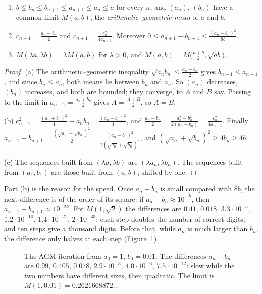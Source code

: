 \begin{proposition}\label{prop:agm}
\begin{enumerate}[label=(\alph*)]
\item $b\le b_n\le b_{n+1}\le a_{n+1}\le a_n\le a$ for every $n$, and $(a_n)$, $(b_n)$ have a common limit $M(a,b)$, the \emph{arithmetic--geometric mean} of $a$ and $b$.
\item $c_{n+1}=\frac{a_n-b_n}2$ and $c_{n+1}=\frac{c_n^2}{4a_{n+1}}$. Moreover $0\le a_{n+1}-b_{n+1}\le\frac{(a_n-b_n)^2}{8b}$.
\item $M(\lambda a,\lambda b)=\lambda M(a,b)$ for $\lambda>0$, and $M(a,b)=M\bigl(\frac{a+b}2,\sqrt{ab}\bigr)$.
\end{enumerate}
\end{proposition}
\begin{proof}
(a) The arithmetic--geometric inequality $\sqrt{a_nb_n}\le\frac{a_n+b_n}2$ gives $b_{n+1}\le a_{n+1}$, and since $b_n\le a_n$, both means lie between $b_n$ and $a_n$.
So $(a_n)$ decreases, $(b_n)$ increases, and both are bounded; they converge, to $A$ and $B$ say. Passing to the limit in $a_{n+1}=\frac{a_n+b_n}2$ gives $A=\frac{A+B}2$, so $A=B$.

(b) $c_{n+1}^2=\frac{(a_n+b_n)^2}4-a_nb_n=\frac{(a_n-b_n)^2}4$, and $\frac{a_n-b_n}2=\frac{a_n^2-b_n^2}{2(a_n+b_n)}=\frac{c_n^2}{4a_{n+1}}$. Finally
$a_{n+1}-b_{n+1}=\frac{(\sqrt{a_n}-\sqrt{b_n})^2}2=\frac{(a_n-b_n)^2}{2(\sqrt{a_n}+\sqrt{b_n})^2}$, and $(\sqrt{a_n}+\sqrt{b_n})^2\ge4b_n\ge4b$.

(c) The sequences built from $(\lambda a,\lambda b)$ are $(\lambda a_n,\lambda b_n)$. The sequences built from $(a_1,b_1)$ are those built from $(a,b)$, shifted by one.
\end{proof}

Part (b) is the reason for the speed. Once $a_n-b_n$ is small compared with $8b$, the next difference is of the order of its square: if $a_n-b_n\approx10^{-k}$,
then $a_{n+1}-b_{n+1}\approx10^{-2k}$. For $M(1,\sqrt2)$ the differences are $0.41$, $0.018$, $3.3\cdot10^{-5}$, $1.2\cdot10^{-10}$, $1.4\cdot10^{-21}$, $2\cdot10^{-43}$:
each step doubles the number of correct digits, and ten steps give a thousand digits. Before that, while $a_n$ is much larger than $b_n$, the
difference only halves at each step (Figure~\ref{fig:agm}).

\begin{figure}[ht]
\centering
{}
\caption{The AGM iteration from $a_0=1$, $b_0=0.01$. The differences $a_n-b_n$ are $0.99$, $0.405$, $0.078$, $2.9\cdot10^{-3}$, $4.0\cdot10^{-6}$, $7.5\cdot10^{-12}$: slow
while the two numbers have different sizes, then quadratic. The limit is $M(1,0.01)=0.2621668872\ldots$}
\label{fig:agm}
\end{figure}

